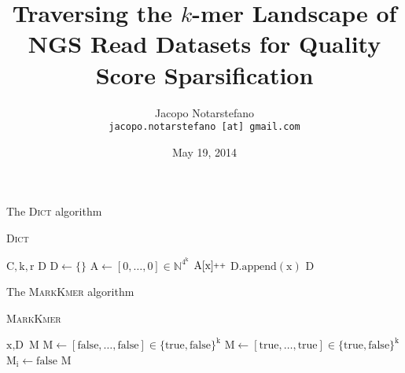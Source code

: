 \documentclass[12pt]{beamer}
\title{Traversing the \(k\)-mer Landscape of NGS Read Datasets for Quality Score Sparsification}
\author[Jacopo Notarstefano]{
    Jacopo Notarstefano\\
    \texttt{jacopo.notarstefano [at] gmail.com}
}
\date{May 19, 2014}
\newcommand{\pp}{\nolinebreak\hspace{-.05em}\raisebox{.4ex}{\tiny\bf +}\nolinebreak\raisebox{.4ex}{\tiny\bf +}}
\begin{document}
    \begin{frame}[plain]
        \titlepage
    \end{frame}

    \begin{frame}{}
    \end{frame}

    \begin{frame}{The \textsc{Dict} algorithm}
        \begin{algorithm}[H]
	    \caption{\textsc{Dict}}
	    \begin{algorithmic}[1]
                \REQUIRE \(\text{C}, \text{k}, \text{r}\)
		\ENSURE \(\text{D}\)
		\STATE \(\text{D} \leftarrow \{\}\)
		\STATE \(\text{A} \leftarrow [0,\dots,0] \in \mathbb{N}^{4^\text{k}}\)
		    \STATE \(\text{A}[\text{x}]\pp\)
		\ENDFOR
		        \STATE \(\text{D}.\text{append}(\text{x})\)
		    \ENDIF
		\ENDFOR
		\RETURN \(\text{D}\)
	    \end{algorithmic}
	\end{algorithm}
    \end{frame}

    \begin{frame}{The \textsc{MarkKmer} algorithm}
        \begin{algorithm}[H]
	    \caption{\textsc{MarkKmer}}
	    \begin{algorithmic}[1]
		\REQUIRE \(\text{x}, \text{D}\)
		\ENSURE \(\text{M}\)
		    \STATE \(\text{M} \leftarrow [\text{false},\dots,\text{false}]\in\{\text{true},\text{false}\}^\text{k}\)
		\ELSE
		    \STATE \(\text{M} \leftarrow [\text{true},\dots,\text{true}]\in\{\text{true},\text{false}\}^\text{k}\)
			        \STATE \(\text{M}_\text{i}\leftarrow\text{false}\)
			    \ENDIF
			\ENDFOR
		    \ENDFOR
		\ENDIF
		\RETURN \(\text{M}\)
	    \end{algorithmic}
	\end{algorithm}
    \end{frame}
\end{document}
